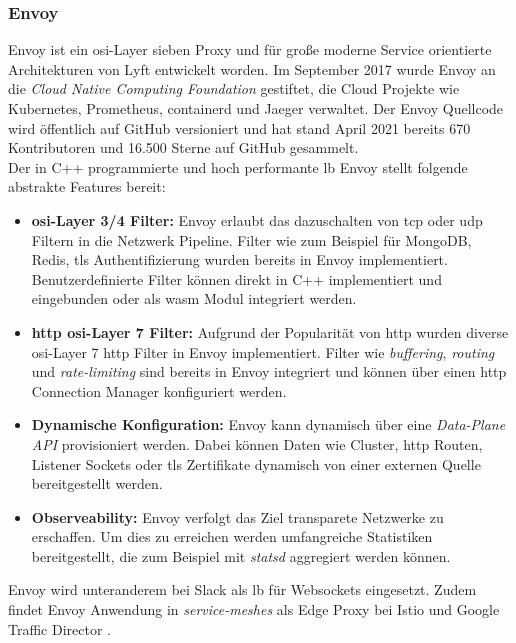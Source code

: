 \subsubsection{Envoy} \label{s:envoy}
Envoy ist ein \ac{osi}-Layer sieben Proxy und für gro{\ss}e moderne Service orientierte Architekturen von Lyft entwickelt worden.
Im September 2017 wurde Envoy an die \textit{Cloud Native Computing Foundation} gestiftet, die Cloud Projekte wie Kubernetes, Prometheus, containerd und Jaeger verwaltet.
Der Envoy Quellcode wird öffentlich auf GitHub versioniert und hat stand April 2021 bereits 670 Kontributoren und 16.500 Sterne auf GitHub gesammelt. \cite{EnvoyproxyEnvoy2021}
\\
Der in C++ programmierte und hoch performante \ac{lb} Envoy stellt folgende abstrakte Features bereit:
\begin{itemize}
    \item \textbf{\acs{osi}-Layer 3/4 Filter:} Envoy erlaubt das dazuschalten von \acs{tcp} oder \acs{udp} Filtern in die Netzwerk Pipeline. Filter wie zum Beispiel für MongoDB, Redis, \ac{tls} Authentifizierung wurden bereits in Envoy implementiert. Benutzerdefinierte Filter können direkt in C++ implementiert und eingebunden oder als \ac{wasm} Modul integriert werden.
    \item \textbf{\acs{http} \ac{osi}-Layer 7 Filter:} Aufgrund der Popularität von \ac{http} wurden diverse \ac{osi}-Layer 7 \ac{http} Filter in Envoy implementiert. Filter wie \textit{buffering}, \textit{routing} und \textit{rate-limiting} sind bereits in Envoy integriert und können über einen \ac{http} Connection Manager konfiguriert werden.
    \item \textbf{Dynamische Konfiguration:} Envoy kann dynamisch über eine \textit{Data-Plane API} provisioniert werden. Dabei können Daten wie Cluster, \ac{http} Routen, Listener Sockets oder \ac{tls} Zertifikate dynamisch von einer externen Quelle bereitgestellt werden.
    \item \textbf{Observeability:} Envoy verfolgt das Ziel transparete Netzwerke zu erschaffen. Um dies zu erreichen werden umfangreiche Statistiken bereitgestellt, die zum Beispiel mit \textit{statsd} aggregiert werden können.
\end{itemize}
\cite{WhatEnvoyEnvoy}
Envoy wird unteranderem bei Slack \cite{MigratingMillionsConcurrent2021} als \acl{lb} für Websockets eingesetzt. Zudem findet Envoy Anwendung in \textit{service-meshes} als Edge Proxy bei Istio \cite{Istio} und Google Traffic Director \cite{TrafficDirectorGoogle}.
\newpage
